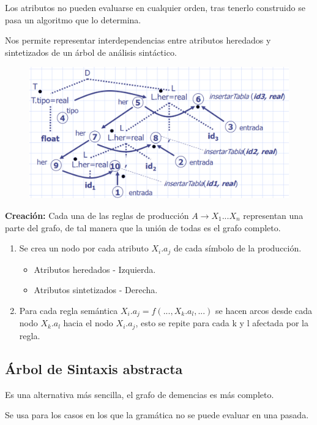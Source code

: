\documentclass[12pt]{report} %
\begin{document}
Los atributos no pueden evaluarse en cualquier orden, tras tenerlo construido se pasa un algoritmo que lo determina.

Nos permite representar interdependencias entre atributos heredados y sintetizados de un árbol de análisis sintáctico.

\begin{figure}[H]
  {\includegraphics[scale=.3]{2021-05-01 01_15_15-05_resum_Sem_2021.pdf - Foxit Reader.png}}
\end{figure}

\textbf{Creación:} Cada una de las reglas de producción $A \rightarrow X_1 ... X_n$ representan una parte del grafo, de tal manera que la unión de todas es el grafo completo.
\begin{enumerate}
  \item Se crea un nodo por cada atributo $X_i.a_j$ de cada símbolo de la producción.
  \begin{itemize}
    \item Atributos heredados - Izquierda.
    \item Atributos sintetizados - Derecha.
  \end{itemize}
  \item Para cada regla semántica $X_i.a_j = f(...,X_k.a_l, ...)$ se hacen arcos desde cada nodo $X_k.a_l$ hacia el nodo $X_i.a_j$, esto se repite para cada k y l afectada por la regla.
\end{enumerate}
\pagebreak
\subsection{Árbol de Sintaxis abstracta}
Es una alternativa más sencilla, el grafo de demencias es más completo.

Se usa para los casos en los que la gramática no se puede evaluar en una pasada.
\end{document}
